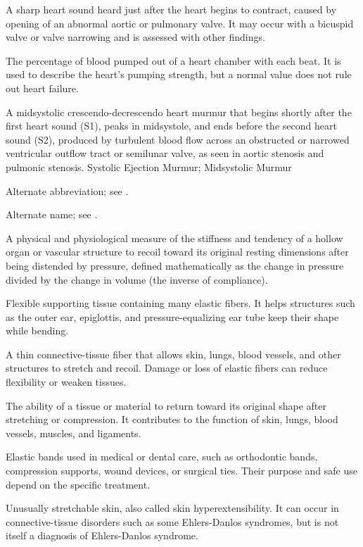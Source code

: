  A sharp heart sound heard just after the heart begins to contract, caused by opening of an abnormal aortic or pulmonary valve. It may occur with a bicuspid valve or valve narrowing and is assessed with other findings.

 The percentage of blood pumped out of a heart chamber with each beat. It is used to describe the heart’s pumping strength, but a normal value does not rule out heart failure.

 A midsystolic crescendo-decrescendo heart murmur that begins shortly after the first heart sound (S1), peaks in midsystole, and ends before the second heart sound (S2), produced by turbulent blood flow across an obstructed or narrowed ventricular outflow tract or semilunar valve, as seen in aortic stenosis and pulmonic stenosis.
\synonyms
Systolic Ejection Murmur; Midsystolic Murmur

 Alternate abbreviation; see .

 Alternate name; see .

 A physical and physiological measure of the stiffness and tendency of a hollow organ or vascular structure to recoil toward its original resting dimensions after being distended by pressure, defined mathematically as the change in pressure divided by the change in volume (the inverse of compliance).

 Flexible supporting tissue containing many elastic fibers. It helps structures such as the outer ear, epiglottis, and pressure-equalizing ear tube keep their shape while bending.

 A thin connective-tissue fiber that allows skin, lungs, blood vessels, and other structures to stretch and recoil. Damage or loss of elastic fibers can reduce flexibility or weaken tissues.

 The ability of a tissue or material to return toward its original shape after stretching or compression. It contributes to the function of skin, lungs, blood vessels, muscles, and ligaments.

 Elastic bands used in medical or dental care, such as orthodontic bands, compression supports, wound devices, or surgical ties. Their purpose and safe use depend on the specific treatment.

 Unusually stretchable skin, also called skin hyperextensibility. It can occur in connective-tissue disorders such as some Ehlers-Danlos syndromes, but is not itself a diagnosis of Ehlers-Danlos syndrome.

